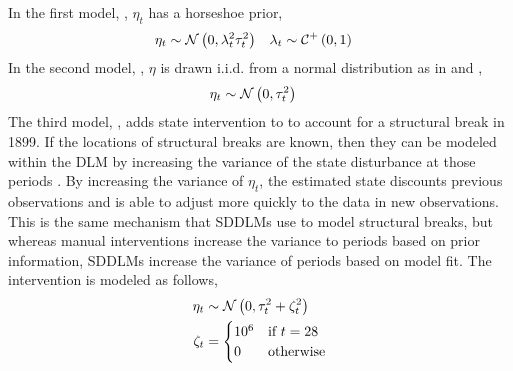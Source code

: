\documentclass{article}
\begin{document}
In the first model, , $\eta_{t}$ has a horseshoe prior,
\begin{equation}
  \label{eq:22}
  \begin{aligned}[t]
    \eta_{t} & \sim \mathcal{N}\left(0, \lambda^{2}_{t} \tau_{t}^{2}\right) & \lambda_{t} & \sim \mathcal{C}^{+}\left(0, 1\right)
  \end{aligned}
\end{equation}
In the second model, , $\eta$ is  drawn i.i.d. from a normal distribution as in \textcite{DurbinKoopman2001} and \textcite{petris2011state},
\begin{equation}
  \label{eq:9}
  \begin{aligned}[t]
    \eta_{t} & \sim \mathcal{N}\left(0, \tau_{t}^{2}\right)
  \end{aligned}
\end{equation}
The third model, , adds state intervention to  to account for a structural break in 1899.
If the locations of structural breaks are known, then they can be modeled within the DLM by increasing the variance of the state disturbance at those periods \textcite[Chapter 11][]{WestHarrison1997}.
By increasing the variance of $\eta_{t}$, the estimated state discounts previous observations and is able to adjust more quickly to the data in new observations.
This is the same mechanism that SDDLMs use to model structural breaks, but whereas manual interventions increase the variance to periods based on prior information, SDDLMs increase the variance of periods based on model fit.
The intervention is modeled as follows,
\begin{equation}
  \label{eq:12}
  \begin{aligned}[t]
    \eta_{t} & \sim \mathcal{N}\left(0, \tau_{t}^{2} + \zeta_{t}^{2}\right) \\
    \zeta_{t} & = 
    \begin{cases}
      10^{6} & \text{if $t = 28$} \\
      0 & \text{otherwise}
    \end{cases}
  \end{aligned}
\end{equation}
\end{document}
